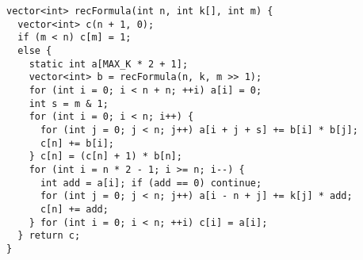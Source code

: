 \begin{lstlisting}
vector<int> recFormula(int n, int k[], int m) {
  vector<int> c(n + 1, 0);
  if (m < n) c[m] = 1;
  else {
    static int a[MAX_K * 2 + 1];
    vector<int> b = recFormula(n, k, m >> 1);
    for (int i = 0; i < n + n; ++i) a[i] = 0;
    int s = m & 1;
    for (int i = 0; i < n; i++) {
      for (int j = 0; j < n; j++) a[i + j + s] += b[i] * b[j];
      c[n] += b[i];
    } c[n] = (c[n] + 1) * b[n];
    for (int i = n * 2 - 1; i >= n; i--) {
      int add = a[i]; if (add == 0) continue;
      for (int j = 0; j < n; j++) a[i - n + j] += k[j] * add;
      c[n] += add;
    } for (int i = 0; i < n; ++i) c[i] = a[i];
  } return c;
}
\end{lstlisting}